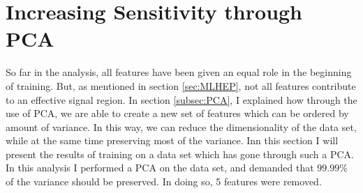 \section{Increasing Sensitivity through PCA}
So far in the analysis, all features have been given an equal role in the beginning of training. 
But, as mentioned in section \ref{sec:MLHEP}, not all features contribute to an effective signal 
region. In section \ref{subsec:PCA}, I explained how through the use of \ac{PCA}, we are able to 
create a new set of features which can be ordered by amount of variance. In this way, we can reduce
the dimensionality of the data set, while at the same time preserving most of the variance. Inn this 
section I will present the results of training on a data set which has gone through such a \ac{PCA}.
\\
In this analysis I performed a \ac{PCA} on the data set, and demanded that $99.99\%$ of the variance 
should be preserved. In doing so, 5 features were removed.

 